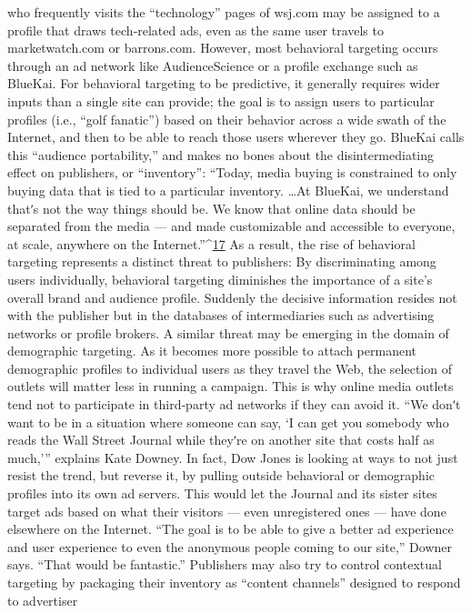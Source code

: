 who frequently visits the ``technology'' pages of wsj.com may be assigned
to a profile that draws tech‐related ads, even as the same user travels to
marketwatch.com or barrons.com.
However, most behavioral targeting occurs through an ad network like
AudienceScience or a profile exchange such as BlueKai. For behavioral
targeting to be predictive, it generally requires wider inputs than a single
site can provide; the goal is to assign users to particular profiles (i.e., ``golf
fanatic'') based on their behavior across a wide swath of the Internet, and
then to be able to reach those users wherever they go. BlueKai calls this
``audience portability,'' and makes no bones about the disintermediating
effect on publishers, or ``inventory'':
``Today, media buying is constrained to only buying data that is
tied to a particular inventory. \ldots  At BlueKai, we understand thatʹs
not the way things should be. We know that online data should be
separated from the media — and made customizable and accessible
to everyone, at scale, anywhere on the Internet.''^{\href{#endnotes}{17}}
As a result, the rise of behavioral targeting represents a distinct threat to
publishers: By discriminating among users individually, behavioral
targeting diminishes the importance of a site’s overall brand and audience
profile. Suddenly the decisive information resides not with the publisher
but in the databases of intermediaries such as advertising networks or
profile brokers. A similar threat may be emerging in the domain of
demographic targeting. As it becomes more possible to attach permanent
demographic profiles to individual users as they travel the Web, the
selection of outlets will matter less in running a campaign.
This is why online media outlets tend not to participate in third‐party ad
networks if they can avoid it. ``We donʹt want to be in a situation where
someone can say, ‘I can get you somebody who reads the Wall Street
Journal while theyʹre on another site that costs half as much,’'' explains
Kate Downey.
In fact, Dow Jones is looking at ways to not just resist the trend, but
reverse it, by pulling outside behavioral or demographic profiles into its
own ad servers. This would let the Journal and its sister sites target ads
based on what their visitors — even unregistered ones — have done
elsewhere on the Internet. ``The goal is to be able to give a better ad
experience and user experience to even the anonymous people coming to
our site,'' Downer says. ``That would be fantastic.''
Publishers may also try to control contextual targeting by packaging their
inventory as ``content channels'' designed to respond to advertiser
